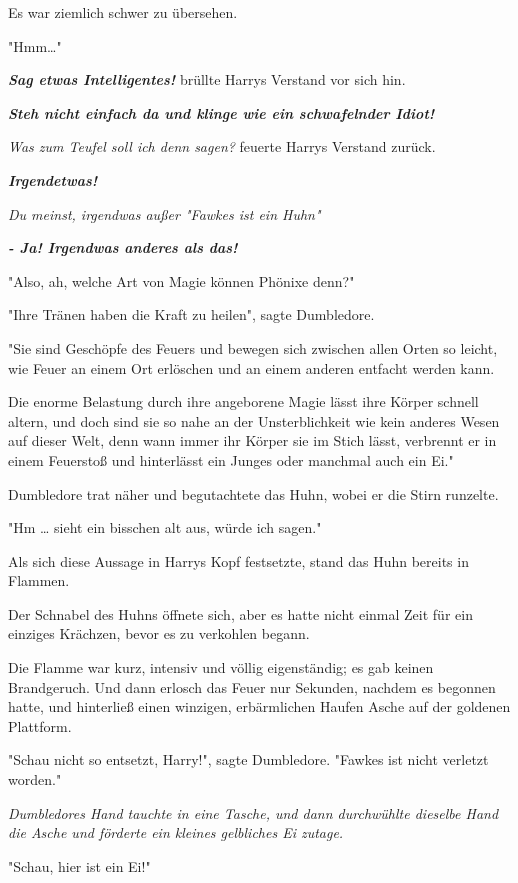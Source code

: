 {Es war ziemlich schwer zu übersehen.

"Hmm…"

\textbf{\emph{Sag etwas Intelligentes!}} brüllte Harrys Verstand vor sich hin.

\textbf{\emph{Steh nicht einfach da und klinge wie ein schwafelnder Idiot!}}

\emph{Was zum Teufel soll ich denn sagen?} feuerte Harrys Verstand zurück.

\textbf{\emph{Irgendetwas!}}

\emph{Du meinst, irgendwas außer "Fawkes ist ein Huhn"}

\textbf{\emph{- Ja! Irgendwas anderes als das!}}

"Also, ah, welche Art von Magie können Phönixe denn?"

"Ihre Tränen haben die Kraft zu heilen", sagte Dumbledore.

"Sie sind Geschöpfe des Feuers und bewegen sich zwischen allen Orten so leicht, wie Feuer an einem Ort erlöschen und an einem anderen entfacht werden kann.

Die enorme Belastung durch ihre angeborene Magie lässt ihre Körper schnell altern, und doch sind sie so nahe an der Unsterblichkeit wie kein anderes Wesen auf dieser Welt, denn wann immer ihr Körper sie im Stich lässt, verbrennt er in einem Feuerstoß und hinterlässt ein Junges oder manchmal auch ein Ei."

Dumbledore trat näher und begutachtete das Huhn, wobei er die Stirn runzelte.

"Hm … sieht ein bisschen alt aus, würde ich sagen."

Als sich diese Aussage in Harrys Kopf festsetzte, stand das Huhn bereits in Flammen.

Der Schnabel des Huhns öffnete sich, aber es hatte nicht einmal Zeit für ein einziges Krächzen, bevor es zu verkohlen begann.

Die Flamme war kurz, intensiv und völlig eigenständig; es gab keinen Brandgeruch. Und dann erlosch das Feuer nur Sekunden, nachdem es begonnen hatte, und hinterließ einen winzigen, erbärmlichen Haufen Asche auf der goldenen Plattform.

"Schau nicht so entsetzt, Harry!", sagte Dumbledore. "Fawkes ist nicht verletzt worden."

\emph{Dumbledores Hand tauchte in eine Tasche, und dann durchwühlte dieselbe Hand die Asche und förderte ein kleines gelbliches Ei zutage.}

"Schau, hier ist ein Ei!"

}
